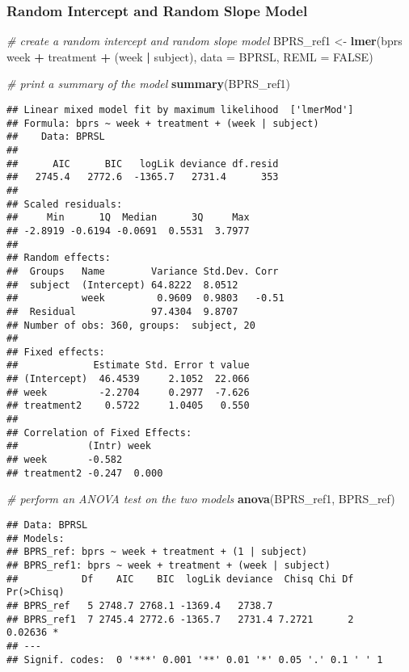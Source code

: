 \documentclass[]{article}
\newenvironment{Shaded}{\begin{snugshade}}{\end{snugshade}}
\newcommand{\KeywordTok}[1]{\textcolor[rgb]{0.13,0.29,0.53}{\textbf{#1}}}
\newcommand{\DataTypeTok}[1]{\textcolor[rgb]{0.13,0.29,0.53}{#1}}
\newcommand{\StringTok}[1]{\textcolor[rgb]{0.31,0.60,0.02}{#1}}
\newcommand{\CommentTok}[1]{\textcolor[rgb]{0.56,0.35,0.01}{\textit{#1}}}
\newcommand{\OtherTok}[1]{\textcolor[rgb]{0.56,0.35,0.01}{#1}}
\newcommand{\OperatorTok}[1]{\textcolor[rgb]{0.81,0.36,0.00}{\textbf{#1}}}
\newcommand{\NormalTok}[1]{#1}
\begin{document}
\subsubsection{Random Intercept and Random Slope
Model}\label{random-intercept-and-random-slope-model}

\begin{Shaded}
\begin{Highlighting}[]
\CommentTok{# create a random intercept and random slope model}
\NormalTok{BPRS_ref1 <-}\StringTok{ }\KeywordTok{lmer}\NormalTok{(bprs }\OperatorTok{~}\StringTok{ }\NormalTok{week }\OperatorTok{+}\StringTok{ }\NormalTok{treatment }\OperatorTok{+}\StringTok{ }\NormalTok{(week }\OperatorTok{|}\StringTok{ }\NormalTok{subject), }\DataTypeTok{data =}\NormalTok{ BPRSL, }\DataTypeTok{REML =} \OtherTok{FALSE}\NormalTok{)}

\CommentTok{# print a summary of the model}
\KeywordTok{summary}\NormalTok{(BPRS_ref1)}
\end{Highlighting}
\end{Shaded}

\begin{verbatim}
## Linear mixed model fit by maximum likelihood  ['lmerMod']
## Formula: bprs ~ week + treatment + (week | subject)
##    Data: BPRSL
## 
##      AIC      BIC   logLik deviance df.resid 
##   2745.4   2772.6  -1365.7   2731.4      353 
## 
## Scaled residuals: 
##     Min      1Q  Median      3Q     Max 
## -2.8919 -0.6194 -0.0691  0.5531  3.7977 
## 
## Random effects:
##  Groups   Name        Variance Std.Dev. Corr 
##  subject  (Intercept) 64.8222  8.0512        
##           week         0.9609  0.9803   -0.51
##  Residual             97.4304  9.8707        
## Number of obs: 360, groups:  subject, 20
## 
## Fixed effects:
##             Estimate Std. Error t value
## (Intercept)  46.4539     2.1052  22.066
## week         -2.2704     0.2977  -7.626
## treatment2    0.5722     1.0405   0.550
## 
## Correlation of Fixed Effects:
##            (Intr) week  
## week       -0.582       
## treatment2 -0.247  0.000
\end{verbatim}

\begin{Shaded}
\begin{Highlighting}[]
\CommentTok{# perform an ANOVA test on the two models}
\KeywordTok{anova}\NormalTok{(BPRS_ref1, BPRS_ref)}
\end{Highlighting}
\end{Shaded}

\begin{verbatim}
## Data: BPRSL
## Models:
## BPRS_ref: bprs ~ week + treatment + (1 | subject)
## BPRS_ref1: bprs ~ week + treatment + (week | subject)
##           Df    AIC    BIC  logLik deviance  Chisq Chi Df Pr(>Chisq)  
## BPRS_ref   5 2748.7 2768.1 -1369.4   2738.7                           
## BPRS_ref1  7 2745.4 2772.6 -1365.7   2731.4 7.2721      2    0.02636 *
## ---
## Signif. codes:  0 '***' 0.001 '**' 0.01 '*' 0.05 '.' 0.1 ' ' 1
\end{verbatim}
\end{document}
